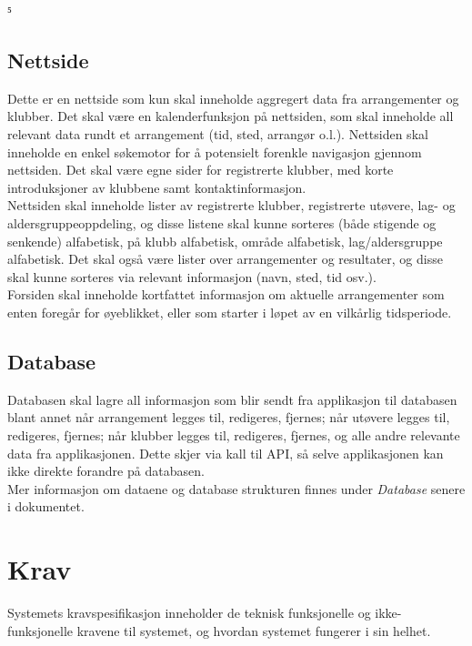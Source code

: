 ⁵\documentclass[norsk]{article}
\begin{document}
\subsection{Nettside}
Dette er en nettside som kun skal inneholde aggregert data fra arrangementer og klubber. Det skal være en kalenderfunksjon på nettsiden, som skal inneholde all relevant data rundt et arrangement (tid, sted, arrangør o.l.). Nettsiden skal inneholde en enkel søkemotor for å potensielt forenkle navigasjon gjennom nettsiden. Det skal være egne sider for registrerte klubber, med korte introduksjoner av klubbene samt kontaktinformasjon.\\
Nettsiden skal inneholde lister av registrerte klubber, registrerte utøvere, lag- og aldersgruppeoppdeling, og disse listene skal kunne sorteres (både stigende og senkende) alfabetisk, på klubb alfabetisk, område alfabetisk, lag/aldersgruppe alfabetisk. Det skal også være lister over arrangementer og resultater, og disse skal kunne sorteres via relevant informasjon (navn, sted, tid osv.).\\
Forsiden skal inneholde kortfattet informasjon om aktuelle arrangementer som enten foregår for øyeblikket, eller som starter i løpet av en vilkårlig tidsperiode.

\subsection{Database}
Databasen skal lagre all informasjon som blir sendt fra applikasjon til databasen blant annet når arrangement legges til, redigeres, fjernes; når utøvere legges til, redigeres, fjernes; når klubber legges til, redigeres, fjernes, og alle andre relevante data fra applikasjonen. Dette skjer via kall til API, så selve applikasjonen kan ikke direkte forandre på databasen.\\
Mer informasjon om dataene og database strukturen finnes under \textit{Database} senere i dokumentet.

\section{Krav}
Systemets kravspesifikasjon inneholder de teknisk funksjonelle og ikke-funksjonelle kravene til systemet, og hvordan systemet fungerer i sin helhet.

\end{document}
